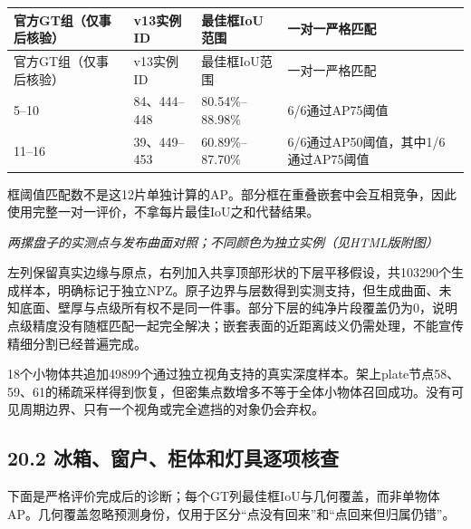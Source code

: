 \documentclass[UTF8,fontset=fandol]{ctexart}
\begin{document}
{\small
\begin{longtable}{|p{}|p{}|p{}|p{}|}
\hline
官方GT组（仅事后核验） & v13实例ID & 最佳框IoU范围 & 一对一严格匹配 \\ \hline
\endfirsthead
\hline
官方GT组（仅事后核验） & v13实例ID & 最佳框IoU范围 & 一对一严格匹配 \\ \hline
\endhead
5–10 & 84、444–448 & 80.54\%–88.98\% & 6/6通过AP75阈值 \\ \hline
11–16 & 39、449–453 & 60.89\%–87.70\% & 6/6通过AP50阈值，其中1/6通过AP75阈值 \\ \hline
\end{longtable}
}

框阈值匹配数不是这12片单独计算的AP。部分框在重叠嵌套中会互相竞争，因此使用完整一对一评价，不拿每片最佳IoU之和代替结果。



\textit{两摞盘子的实测点与发布曲面对照；不同颜色为独立实例（见HTML版附图）}



左列保留真实边缘与原点，右列加入共享顶部形状的下层平移假设，共103290个生成样本，明确标记于独立NPZ。原子边界与层数得到实测支持，但生成曲面、未知底面、壁厚与点级所有权不是同一件事。部分下层的纯净片段覆盖仍为0，说明点级精度没有随框匹配一起完全解决；嵌套表面的近距离歧义仍需处理，不能宣传精细分割已经普遍完成。



18个小物体共追加49899个通过独立视角支持的真实深度样本。架上plate节点58、59、61的稀疏采样得到恢复，但密集点数增多不等于全体小物体召回成功。没有可见周期边界、只有一个视角或完全遮挡的对象仍会弃权。



\subsection*{20.2 冰箱、窗户、柜体和灯具逐项核查}

下面是严格评价完成后的诊断；每个GT列最佳框IoU与几何覆盖，而非单物体AP。几何覆盖忽略预测身份，仅用于区分“点没有回来”和“点回来但归属仍错”。
\end{document}
